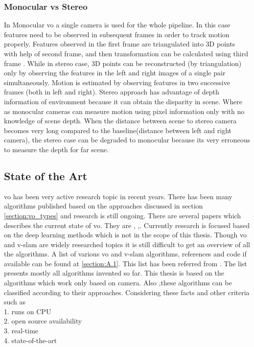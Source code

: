 \subsubsection{Monocular vs Stereo}
In Monocular \acrshort{vo} a single camera is used for the whole pipeline. In this case features need to be observed in subsequent frames in order to track motion properly. Features observed in the first frame are triangulated into 3D points with help of second frame, and then transformation can be calculated using third frame \cite{KhalidYousif-et-al-2015}. While in stereo case, 3D points can be reconstructed (by triangulation) only by observing the features in the left and right images of a single pair simultaneously. Motion is estimated by observing features in two successive frames (both in left and right). Stereo approach has advantage of depth information of environment because it can obtain the disparity in scene. Where as monocular cameras can measure motion using pixel information only with no knowledge of scene depth. When the distance between scene to stereo camera becomes very long compared to the baseline(distance between left and right camera), the stereo case can be degraded to monocular because its very erroneous to measure the depth for far scene. 

\subsection{State of the Art}

\acrshort{vo} has been very active research topic in recent years. There has been many algorithms published based on the approaches discussed in section \ref{section:vo_types} and research is still ongoing. There are several papers which describes the current state of \acrshort{vo}. They are \cite{Aqel-et-al-2016}, \cite{KhalidYousif-et-al-2015} ,\cite{ScaramuzzaVO}. Currently research is focused based on the deep learning methods \cite{7989236} \cite{yang20d3vo} which is not in the scope of this thesis. Though \acrshort{vo} and \acrshort{v-slam} are widely researched topics it is still difficult to get an overview of all the algorithms. A list of various \acrshort{vo} and \acrshort{v-slam} algorithms, references and code if available can be found at \ref{section:A.1}. This list has been referred from \cite{chris}. The list presents mostly all algorithms invented so far. This thesis is based on the algorithms which work only based on camera. Also ,these algorithms can be classified according to their approaches. Considering these facts and other criteria such as \\
	1. runs on CPU  \\
	2. open source availability \\
	3. real-time \\
	4. state-of-the-art \\

